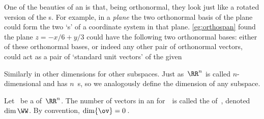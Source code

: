 One of the beauties of an  is that, being orthonormal, they look just like a rotated version of the s.
For example, in a \emph{plane} the two orthonormal basis of the plane could form the two `s' of a coordinate system in that plane.
\cref{eg:orthospan} found the plane \(z=-x/6+y/3\) could have the following two orthonormal bases: either of these orthonormal bases, or indeed any other pair of orthonormal vectors, could act as a pair of `standard unit vectors' of the given 
\begin{center}
\quad
{} 
\end{center}
Similarly in other dimensions for other subspaces.
Just as~\(\RR^n\) is called \(n\)-dimensional and has \(n\)~s, so we analogously define the dimension of any subspace.

\begin{definition} \label{def:dim} 
Let \WW\ be a  of~\(\RR^n\). 
The number of vectors in an  for~\WW\ is called the  of~\WW, denoted~\(\dim\WW\).
By convention, \(\dim\{\ov\}=0\)\,.
\end{definition}

